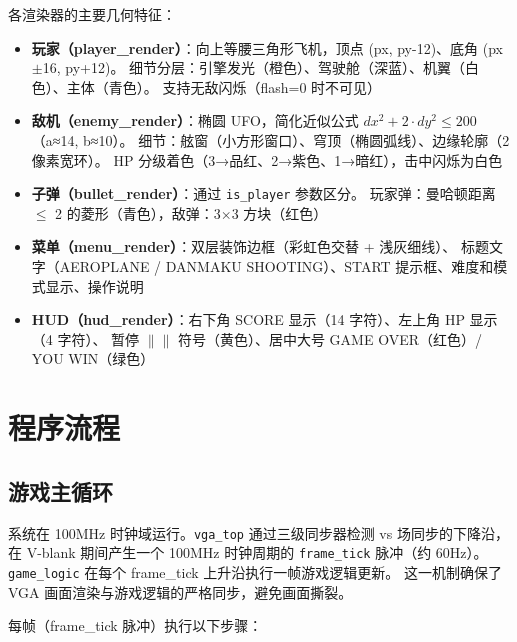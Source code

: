 \documentclass[12pt,a4paper]{ctexart}
\begin{document}
各渲染器的主要几何特征：
\begin{itemize}
    \item \textbf{玩家（player\_render）}：向上等腰三角形飞机，顶点 (px, py-12)、底角 (px$\pm$16, py+12)。
    细节分层：引擎发光（橙色）、驾驶舱（深蓝）、机翼（白色）、主体（青色）。
    支持无敌闪烁（flash=0 时不可见）
    \item \textbf{敌机（enemy\_render）}：椭圆 UFO，简化近似公式 $dx^2 + 2\cdot dy^2 \le 200$（a≈14, b≈10）。
    细节：舷窗（小方形窗口）、穹顶（椭圆弧线）、边缘轮廓（2 像素宽环）。
    HP 分级着色（3→品红、2→紫色、1→暗红），击中闪烁为白色
    \item \textbf{子弹（bullet\_render）}：通过 \texttt{is\_player} 参数区分。
    玩家弹：曼哈顿距离 $\le$ 2 的菱形（青色），敌弹：3$\times$3 方块（红色）
    \item \textbf{菜单（menu\_render）}：双层装饰边框（彩虹色交替 + 浅灰细线）、
    标题文字（AEROPLANE / DANMAKU SHOOTING）、START 提示框、难度和模式显示、操作说明
    \item \textbf{HUD（hud\_render）}：右下角 SCORE 显示（14 字符）、左上角 HP 显示（4 字符）、
    暂停 $\|$$\|$ 符号（黄色）、居中大号 GAME OVER（红色）/ YOU WIN（绿色）
\end{itemize}


\section{程序流程}

\subsection{游戏主循环}

系统在 100MHz 时钟域运行。\texttt{vga\_top} 通过三级同步器检测 vs 场同步的下降沿，
在 V-blank 期间产生一个 100MHz 时钟周期的 \texttt{frame\_tick} 脉冲（约 60Hz）。
\texttt{game\_logic} 在每个 frame\_tick 上升沿执行一帧游戏逻辑更新。
这一机制确保了 VGA 画面渲染与游戏逻辑的严格同步，避免画面撕裂。

每帧（frame\_tick 脉冲）执行以下步骤：
\end{document}
